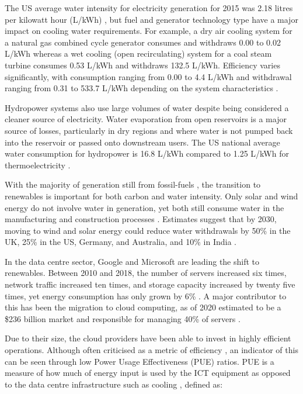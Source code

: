 \documentclass{article}
\begin{document}
The US average water intensity for electricity generation for 2015 was 2.18
litres per kilowatt hour (L/kWh) \cite{lee_regional_2018}, but fuel and
generator technology type have a major impact on cooling water requirements.
For example, a dry air cooling system for a natural gas combined cycle
generator consumes and withdraws 0.00 to 0.02 L/kWh whereas a wet cooling (open
recirculating) system for a coal steam turbine consumes 0.53 L/kWh and
withdraws 132.5 L/kWh. Efficiency varies significantly, with consumption
ranging from 0.00 to 4.4 L/kWh and withdrawal ranging from 0.31 to 533.7 L/kWh
depending on the system characteristics \cite{pan_cooling_2018}.

Hydropower systems also use large volumes of water despite being considered a
cleaner source of electricity. Water evaporation from open reservoirs is a
major source of losses, particularly in dry regions and where water is not
pumped back into the reservoir or passed onto downstream users. The US national
average water consumption for hydropower is 16.8 L/kWh compared to 1.25 L/kWh
for thermoelectricity \cite{lee_regional_2018}.

With the majority of generation still from fossil-fuels
\cite{iea_electricity_2019}, the transition to renewables is important for both
carbon and water intensity. Only solar and wind energy do not involve water in
generation, yet both still consume water in the manufacturing and construction
processes \cite{unesco_united_2020}. Estimates suggest that by 2030, moving to
wind and solar energy could reduce water withdrawals by 50\% in the UK, 25\% in
the US, Germany, and Australia, and 10\% in India \cite{irena_renewable_2015}.

In the data centre sector, Google and Microsoft are leading the shift to
renewables. Between 2010 and 2018, the number of servers increased six times,
network traffic increased ten times, and storage capacity increased by twenty
five times, yet energy consumption has only grown by 6\%
\cite{masanet_recalibrating_2020}. A major contributor to this has been the
migration to cloud computing, as of 2020 estimated to be a \$236 billion market
\cite{adams_forrester_2017} and responsible for managing 40\% of servers
\cite{shehabi_united_2016}.

Due to their size, the cloud providers have been able to invest in highly
efficient operations. Although often criticised as a metric of efficiency
\cite{brady_case_2013}, an indicator of this can be seen through low Power
Usage Effectiveness (PUE) ratios. PUE is a measure of how much of energy input
is used by the ICT equipment as opposed to the data centre infrastructure such
as cooling \cite{iso_isoiec_nodate}, defined as:
\end{document}
